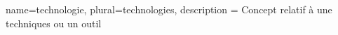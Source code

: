 {
  name=technologie, 
  plural=technologies,
  description = {Concept relatif à une techniques ou un outil}
}